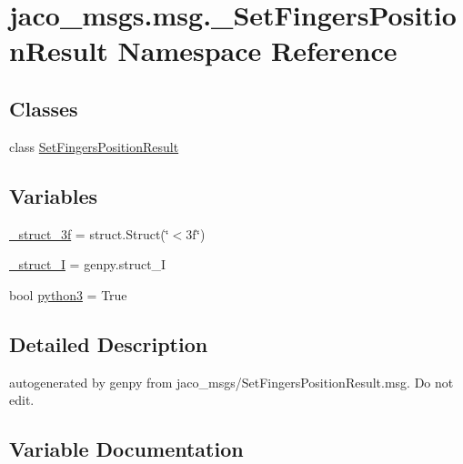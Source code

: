 \hypertarget{namespacejaco__msgs_1_1msg_1_1__SetFingersPositionResult}{}\section{jaco\+\_\+msgs.\+msg.\+\_\+\+Set\+Fingers\+Position\+Result Namespace Reference}
\label{namespacejaco__msgs_1_1msg_1_1__SetFingersPositionResult}
\subsection*{Classes}
\begin{DoxyCompactItemize}
\item 
class \hyperlink{classjaco__msgs_1_1msg_1_1__SetFingersPositionResult_1_1SetFingersPositionResult}{Set\+Fingers\+Position\+Result}
\end{DoxyCompactItemize}
\subsection*{Variables}
\begin{DoxyCompactItemize}
\item 
\hyperlink{namespacejaco__msgs_1_1msg_1_1__SetFingersPositionResult_a9f9793818aa38239912b24576e43e94f}{\+\_\+struct\+\_\+3f} = struct.\+Struct(\char`\"{}$<$3f\char`\"{})
\item 
\hyperlink{namespacejaco__msgs_1_1msg_1_1__SetFingersPositionResult_afa4c6324a89a098423459ee53c9988ff}{\+\_\+struct\+\_\+I} = genpy.\+struct\+\_\+I
\item 
bool \hyperlink{namespacejaco__msgs_1_1msg_1_1__SetFingersPositionResult_a2a8fd012a0fe75c8d72d36c6695d85ef}{python3} = True
\end{DoxyCompactItemize}


\subsection{Detailed Description}
\begin{DoxyVerb}autogenerated by genpy from jaco_msgs/SetFingersPositionResult.msg. Do not edit.\end{DoxyVerb}
 

\subsection{Variable Documentation}
